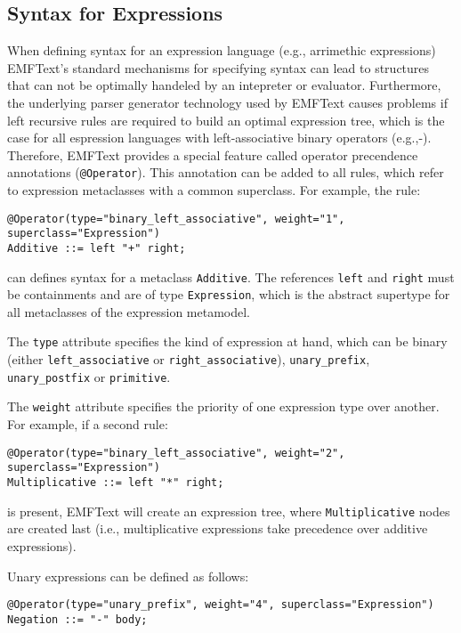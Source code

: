 \subsection{Syntax for Expressions}
When defining syntax for an expression language (e.g., arrimethic expressions) 
EMFText's standard mechanisms for specifying syntax can lead to structures that 
can not be optimally handeled by an intepreter or evaluator. Furthermore, the 
underlying parser generator technology used by EMFText causes problems if 
left recursive rules are required to build an optimal expression tree, which is 
the case for all espression languages with left-associative binary operators 
(e.g.,-). Therefore, EMFText provides a special feature called operator 
precendence annotations (\texttt{@Operator}). This annotation can be added to 
all rules, which refer to expression metaclasses with a common superclass. 
For example, the rule:

\begin{lstlisting}
@Operator(type="binary_left_associative", weight="1", superclass="Expression")
Additive ::= left "+" right;
\end{lstlisting}

can defines syntax for a metaclass \texttt{Additive}. The references
\texttt{left} and \texttt{right} must be containments and are of type
\texttt{Expression}, which is the abstract supertype for all metaclasses of the 
expression metamodel.

The \texttt{type} attribute specifies the kind of expression at hand, which can
be binary (either \texttt{left\_associative} or \texttt{right\_associative}),
\texttt{unary\_prefix}, \texttt{unary\_postfix} or \texttt{primitive}.

The \texttt{weight} attribute specifies the priority of one expression type over
another. For example, if a second rule:

\begin{lstlisting}
@Operator(type="binary_left_associative", weight="2", superclass="Expression")
Multiplicative ::= left "*" right;
\end{lstlisting}

is present, EMFText will create an expression tree, where
\texttt{Multiplicative} nodes are created last (i.e., multiplicative expressions 
take precedence over additive expressions).

Unary expressions can be defined as follows:

\begin{lstlisting}
@Operator(type="unary_prefix", weight="4", superclass="Expression")	
Negation ::= "-" body;
\end{lstlisting}


